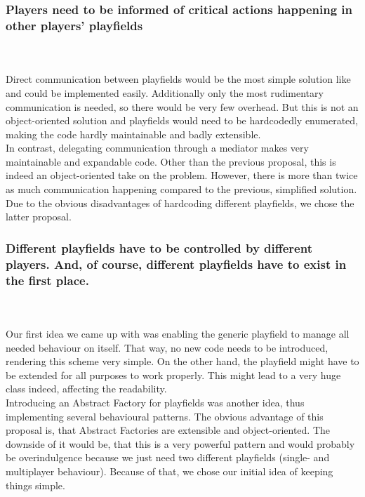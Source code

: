   \subsubsection{Players need to be informed of critical actions happening in other players' playfields}
  ~\\ \\
    Direct communication between playfields would be the most simple solution like and 
    could be implemented easily. Additionally only the most rudimentary communication is needed,
    so there would be very few overhead. But this is not an object-oriented solution and playfields 
    would need to be hardcodedly enumerated, making the code hardly maintainable and badly extensible.\\
    In contrast, delegating communication through a mediator makes very maintainable and
    expandable code. Other than the previous proposal, this is indeed an object-oriented 
    take on the problem. However, there is more than twice as much communication happening 
    compared to the previous, simplified solution.\\
    Due to the obvious disadvantages of hardcoding different playfields, we chose the latter proposal.\\

  \subsubsection{Different playfields have to be controlled by different players.
             And, of course, different playfields have to exist in the first place.}
  ~\\ \\
    Our first idea we came up with was enabling the generic playfield to manage all needed behaviour
    on itself. That way, no new code needs to be introduced, rendering this scheme very simple.
    On the other hand, the playfield might have to be extended for all purposes to work properly. 
    This might lead to a very huge class indeed, affecting the readability.\\
    Introducing an Abstract Factory for playfields was another idea, thus implementing several 
    behavioural patterns. The obvious advantage of this proposal is, that Abstract Factories 
    are extensible and object-oriented. The downside of it would be, that this is a very powerful 
    pattern and would probably be overindulgence because we just need two different playfields 
    (single- and multiplayer behaviour). Because of that, we chose our initial idea of keeping 
    things simple.\\
%

